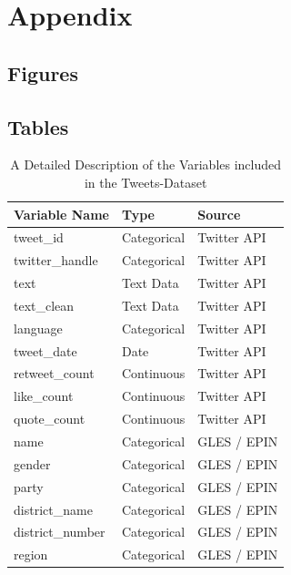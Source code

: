 \documentclass[a4paper,11pt]{article}
\begin{document}
\newpage
\appendix

\hypertarget{appendix}{%
\section{Appendix}\label{appendix}}

\hypertarget{figures}{%
\subsection{Figures}\label{figures}}

\newpage

\hypertarget{tables}{%
\subsection{Tables}\label{tables}}
\begin{table}[H]
    \begin{center}
        \caption{A Detailed Description of the Variables included in the Tweets-Dataset}
        \label{tab:apptable}
        {\footnotesize
        \begin{tabularx}{\textwidth}{L|L|L} %
        \hline \hline
        Variable Name & Type & Source \\
        \hline
        tweet\_id & Categorical & Twitter API \\
        twitter\_handle & Categorical & Twitter API \\
        text & Text Data & Twitter API \\
        text\_clean & Text Data & Twitter API \\
        language & Categorical & Twitter API \\
        tweet\_date & Date & Twitter API \\
        retweet\_count & Continuous & Twitter API \\
        like\_count & Continuous & Twitter API \\
        quote\_count & Continuous & Twitter API \\
        name & Categorical & GLES / EPIN \\
        gender & Categorical & GLES / EPIN \\
        party & Categorical & GLES / EPIN \\
        district\_name & Categorical & GLES / EPIN \\
        district\_number & Categorical & GLES / EPIN \\
        region & Categorical & GLES / EPIN \\

\end{tabularx}}
\end{center}
\end{table}
\end{document}
